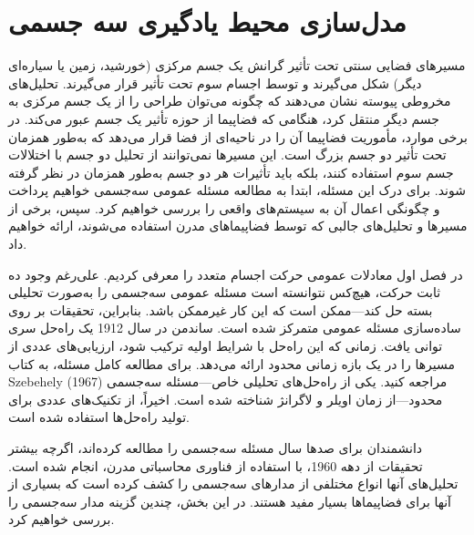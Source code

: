 \chapter{مدل‌سازی محیط یادگیری سه‌ جسمی}
مسیرهای فضایی سنتی تحت تأثیر گرانش یک جسم مرکزی (خورشید، زمین یا سیاره‌ای دیگر) شکل می‌گیرند و توسط اجسام سوم تحت تأثیر قرار می‌گیرند. تحلیل‌های مخروطی پیوسته نشان می‌دهند که چگونه می‌توان طراحی را از یک جسم مرکزی به جسم دیگر منتقل کرد، هنگامی که فضاپیما از حوزه تأثیر یک جسم عبور می‌کند. در برخی موارد، مأموریت فضاپیما آن را در ناحیه‌ای از فضا قرار می‌دهد که به‌طور همزمان تحت تأثیر دو جسم بزرگ است. این مسیرها نمی‌توانند از تحلیل دو جسم با اختلالات جسم سوم استفاده کنند، بلکه باید تأثیرات هر دو جسم به‌طور همزمان در نظر گرفته شوند. برای درک این مسئله، ابتدا به مطالعه مسئله عمومی سه‌جسمی خواهیم پرداخت و چگونگی اعمال آن به سیستم‌های واقعی را بررسی خواهیم کرد. سپس، برخی از مسیرها و تحلیل‌های جالبی که توسط فضاپیماهای مدرن استفاده می‌شوند، ارائه خواهیم داد.

در فصل اول معادلات عمومی حرکت اجسام متعدد را معرفی کردیم. علی‌رغم وجود ده ثابت حرکت، هیچ‌کس نتوانسته است مسئله عمومی سه‌جسمی را به‌صورت تحلیلی بسته حل کند—ممکن است که این کار غیرممکن باشد. بنابراین، تحقیقات بر روی ساده‌سازی مسئله عمومی متمرکز شده است. ساندمن در سال 1912 یک راه‌حل سری توانی یافت. زمانی که این راه‌حل با شرایط اولیه ترکیب شود، ارزیابی‌های عددی از مسیرها را در یک بازه زمانی محدود ارائه می‌دهد. برای مطالعه کامل مسئله، به کتاب Szebehely (1967) مراجعه کنید. یکی از راه‌حل‌های تحلیلی خاص—مسئله سه‌جسمی محدود—از زمان اویلر و لاگرانژ شناخته شده است. اخیراً، از تکنیک‌های عددی برای تولید راه‌حل‌ها استفاده شده است.

دانشمندان برای صدها سال مسئله سه‌جسمی را مطالعه کرده‌اند، اگرچه بیشتر تحقیقات از دهه 1960، با استفاده از فناوری محاسباتی مدرن، انجام شده است. تحلیل‌های آنها انواع مختلفی از مدارهای سه‌جسمی را کشف کرده است که بسیاری از آنها برای فضاپیماها بسیار مفید هستند. در این بخش، چندین گزینه مدار سه‌جسمی را بررسی خواهیم کرد.



